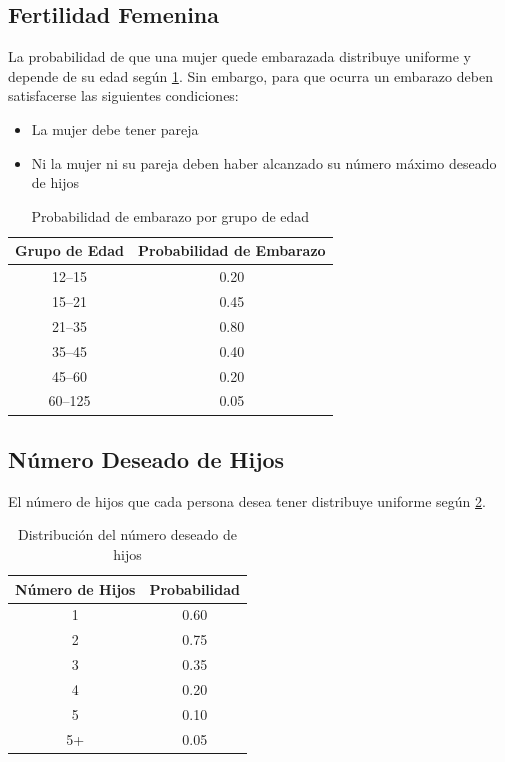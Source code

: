 \documentclass[12pt, a4paper, spanish]{report}
\begin{document}
\subsection{Fertilidad Femenina}

La probabilidad de que una mujer quede embarazada distribuye uniforme y depende de su edad según \ref{table:pregnancy_by_age}. Sin embargo, para que ocurra un embarazo deben satisfacerse las siguientes condiciones:

\begin{itemize}
    \item La mujer debe tener pareja
    \item Ni la mujer ni su pareja deben haber alcanzado su número máximo deseado de hijos
\end{itemize}

\begin{table}[h]
    \centering
    \caption{Probabilidad de embarazo por grupo de edad}\label{table:pregnancy_by_age}
    \begin{tabular}{|c|c|}
    \hline
    \textbf{Grupo de Edad} & \textbf{Probabilidad de Embarazo} \\
    \hline
    12--15 & 0.20 \\
    15--21 & 0.45 \\
    21--35 & 0.80 \\
    35--45 & 0.40 \\
    45--60 & 0.20 \\
    60--125 & 0.05 \\
    \hline
    \end{tabular}
\end{table}

\subsection{Número Deseado de Hijos}

El número de hijos que cada persona desea tener distribuye uniforme según \ref{table:desired_children}.

\begin{table}[h]
    \centering
    \caption{Distribución del número deseado de hijos}\label{table:desired_children}
    \begin{tabular}{|c|c|}
    \hline
    \textbf{Número de Hijos} & \textbf{Probabilidad} \\
    \hline
    1 & 0.60 \\
    2 & 0.75 \\
    3 & 0.35 \\
    4 & 0.20 \\
    5 & 0.10 \\
    5+ & 0.05 \\
    \hline
    \end{tabular}
\end{table}
\end{document}
